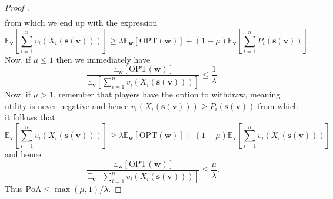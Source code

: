 \begin{proof}[Proof \cite{Syrgkanis2013Composable}]
\begin{align*}
  \end{align*}
  from which we end up with the expression
  \begin{equation}
    \mathbb{E}_{\mathbf{v}}\left[\sum_{i = 1}^{n} v_i(X_i(\mathbf{s}(\mathbf{v}))) \right] \geq \lambda\mathbb{E}_{\mathbf{w}} \left[ \text{OPT}(\mathbf{w}) \right] + (1 - \mu)\mathbb{E}_{\mathbf{v}}\left[ \sum_{i = 1}^{n} P_i(\mathbf{s}(\mathbf{v})) \right].
  \end{equation}
  Now, if $ \mu \leq 1 $ then we immediately have
  \begin{equation}
    \frac{\mathbb{E}_{\mathbf{w}} \left[ \text{OPT}(\mathbf{w}) \right]}{\mathbb{E}_{\mathbf{v}}\left[ \sum_{i = 1}^{n} v_i(X_i(\mathbf{s}(\mathbf{v}))) \right]} \leq \frac{1}{\lambda}.
  \end{equation}
  Now, if $ \mu > 1 $, remember that players have the option to withdraw, meaning utility is never negative and hence $ v_i(X_i(\mathbf{s}(\mathbf{v}))) \geq P_i(\mathbf{s}(\mathbf{v})) $ from which it follows that
  \begin{equation}
    \mathbb{E}_{\mathbf{v}}\left[\sum_{i = 1}^{n} v_i(X_i(\mathbf{s}(\mathbf{v}))) \right] \geq \lambda\mathbb{E}_{\mathbf{w}} \left[ \text{OPT}(\mathbf{w}) \right] + (1 - \mu)\mathbb{E}_{\mathbf{v}}\left[ \sum_{i = 1}^{n} v_i(X_i(\mathbf{s}(\mathbf{v}))) \right]
  \end{equation}
  and hence
  \begin{equation}
    \frac{\mathbb{E}_{\mathbf{w}} \left[ \text{OPT}(\mathbf{w}) \right]}{\mathbb{E}_{\mathbf{v}}\left[ \sum_{i = 1}^{n} v_i(X_i(\mathbf{s}(\mathbf{v}))) \right]} \leq \frac{\mu}{\lambda}.
  \end{equation}
  Thus $ \text{PoA} \leq \max(\mu, 1)/\lambda $.
\end{proof}

